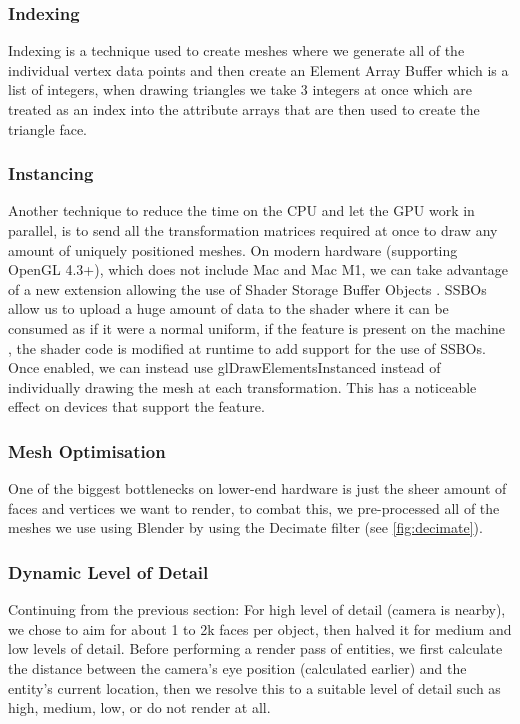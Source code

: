 \documentclass{article}
\begin{document}
\begin{multicols}{2}
                \subsubsection{Indexing}

                    Indexing is a technique used to create meshes where we generate all of the individual vertex data points and then create an Element Array Buffer which is a list of integers, when drawing triangles we take 3 integers at once which are treated as an index into the attribute arrays that are then used to create the triangle face.

                \subsubsection{Instancing}

                    Another technique to reduce the time on the CPU and let the GPU work in parallel, is to send all the transformation matrices required at once to draw any amount of uniquely positioned meshes. On modern hardware (supporting OpenGL 4.3+), which does not include Mac and Mac M1, we can take advantage of a new extension allowing the use of Shader Storage Buffer Objects \cite{ssbo}. SSBOs allow us to upload a huge amount of data to the shader where it can be consumed as if it were a normal uniform, if the feature is present on the machine \cite{extension-list}, the shader code is modified at runtime to add support for the use of SSBOs. Once enabled, we can instead use glDrawElementsInstanced instead of individually drawing the mesh at each transformation. This has a noticeable effect on devices that support the feature.

                \subsubsection{Mesh Optimisation}

                    One of the biggest bottlenecks on lower-end hardware is just the sheer amount of faces and vertices we want to render, to combat this, we pre-processed all of the meshes we use using Blender by using the Decimate filter (see \autoref{fig:decimate}).

                \subsubsection{Dynamic Level of Detail}

                    Continuing from the previous section: For high level of detail (camera is nearby), we chose to aim for about 1 to 2k faces per object, then halved it for medium and low levels of detail. Before performing a render pass of entities, we first calculate the distance between the camera’s eye position (calculated earlier) and the entity’s current location, then we resolve this to a suitable level of detail such as high, medium, low, or do not render at all.


\end{multicols}
\end{document}
